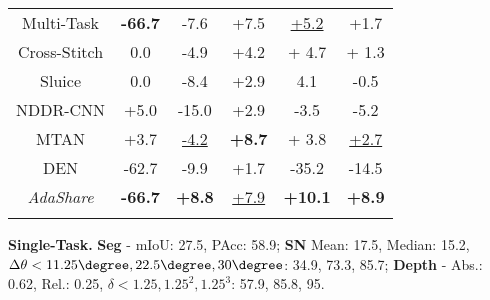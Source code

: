 \begin{table}
{\begin{center}
{\begin{tabular}{c|c|ccc|c}
            \Xhline{3\arrayrulewidth} 
Multi-Task &  \textbf{-66.7} & -7.6 & +7.5 & \underline{+5.2} & +1.7\\
            Cross-Stitch & 0.0 & -4.9 & +4.2 & + 4.7 & + 1.3\\
            Sluice & 0.0 & -8.4 & +2.9 & 4.1 & -0.5\\
            NDDR-CNN & +5.0 & -15.0 & +2.9 & -3.5 & -5.2 \\
            MTAN & +3.7 & \underline{-4.2} & \textbf{+8.7} & + 3.8  & \underline{+2.7}\\
            DEN & -62.7 & -9.9 & +1.7 & -35.2 & -14.5\\
            \hline
            \textit{AdaShare} &\textbf{ -66.7} &\textbf{ +8.8}&  \underline{+7.9} & \textbf{+10.1} & \textbf{+8.9}\\
            \Xhline{3\arrayrulewidth} 
        \end{tabular}}
        \begin{flushleft}
         {\scriptsize \textbf{Single-Task.} \textbf{Seg} - mIoU: 27.5, PAcc: 58.9; \textbf{SN} Mean: 17.5, Median: 15.2, $\Delta \theta < 11.25\degree, 22.5\degree, 30\degree$: 34.9, 73.3, 85.7; \textbf{Depth} - Abs.: 0.62, Rel.: 0.25, $\delta < 1.25, 1.25^2,1.25^3 $: 57.9, 85.8, 95.}
         \end{flushleft}
    \end{center}
} \vspace{-5mm}
\end{table}
 










